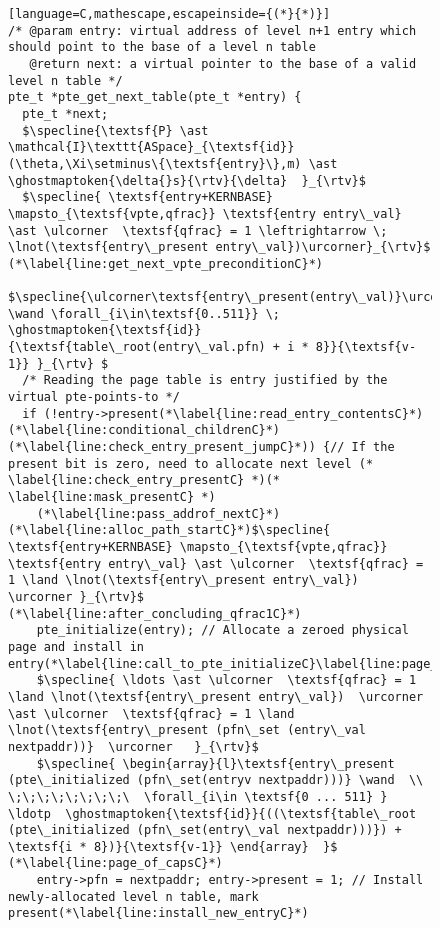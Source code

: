 \begin{figure}\footnotesize
\ifPLDI
\begin{lstlisting}[language=C,mathescape,escapeinside={(*}{*)}]
/* @param entry: virtual address of level n+1 entry which should point to the base of a level n table
   @return next: a virtual pointer to the base of a valid level n table */
pte_t *pte_get_next_table(pte_t *entry) {
  pte_t *next;
  $\specline{\textsf{P} \ast \mathcal{I}\texttt{ASpace}_{\textsf{id}}(\theta,\Xi\setminus\{\textsf{entry}\},m) \ast \ghostmaptoken{\delta{}s}{\rtv}{\delta}  }_{\rtv}$
  $\specline{ \textsf{entry+KERNBASE} \mapsto_{\textsf{vpte,qfrac}} \textsf{entry entry\_val} \ast \ulcorner  \textsf{qfrac} = 1 \leftrightarrow \; \lnot(\textsf{entry\_present entry\_val})\urcorner}_{\rtv}$ (*\label{line:get_next_vpte_preconditionC}*)
  $\specline{\ulcorner\textsf{entry\_present(entry\_val)}\urcorner \wand \forall_{i\in\textsf{0..511}} \; \ghostmaptoken{\textsf{id}}{\textsf{table\_root(entry\_val.pfn) + i * 8}}{\textsf{v-1}} }_{\rtv} $ 
  /* Reading the page table is entry justified by the virtual pte-points-to */
  if (!entry->present(*\label{line:read_entry_contentsC}*)(*\label{line:conditional_childrenC}*)(*\label{line:check_entry_present_jumpC}*)) {// If the present bit is zero, need to allocate next level (* \label{line:check_entry_presentC} *)(* \label{line:mask_presentC} *) 
    (*\label{line:pass_addrof_nextC}*)(*\label{line:alloc_path_startC}*)$\specline{ \textsf{entry+KERNBASE} \mapsto_{\textsf{vpte,qfrac}} \textsf{entry entry\_val} \ast \ulcorner  \textsf{qfrac} = 1 \land \lnot(\textsf{entry\_present entry\_val})  \urcorner }_{\rtv}$ (*\label{line:after_concluding_qfrac1C}*)
    pte_initialize(entry); // Allocate a zeroed physical page and install in entry(*\label{line:call_to_pte_initializeC}\label{line:page_of_capsC}*)
    $\specline{ \ldots \ast \ulcorner  \textsf{qfrac} = 1 \land \lnot(\textsf{entry\_present entry\_val})  \urcorner \ast \ulcorner  \textsf{qfrac} = 1 \land \lnot(\textsf{entry\_present (pfn\_set (entry\_val nextpaddr))}  \urcorner   }_{\rtv}$
    $\specline{ \begin{array}{l}\textsf{entry\_present (pte\_initialized (pfn\_set(entryv nextpaddr)))} \wand  \\ \;\;\;\;\;\;\;\;\  \forall_{i\in \textsf{0 ... 511} } \ldotp  \ghostmaptoken{\textsf{id}}{((\textsf{table\_root (pte\_initialized (pfn\_set(entry\_val nextpaddr)))}) + \textsf{i * 8})}{\textsf{v-1}} \end{array}  }$ (*\label{line:page_of_capsC}*)
    entry->pfn = nextpaddr; entry->present = 1; // Install newly-allocated level n table, mark present(*\label{line:install_new_entryC}*)

\end{lstlisting}
\end{figure}

